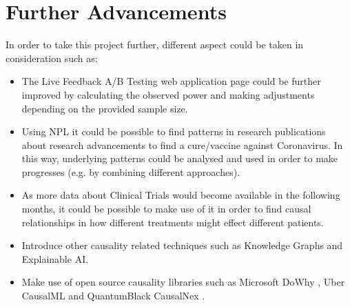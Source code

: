 \section{Further Advancements}

In order to take this project further, different aspect could be taken in consideration such as:
\vspace{-0.2cm}
\begin{itemize}
    \item The Live Feedback A/B Testing web application page could be further improved by calculating the observed power and making adjustments depending on the provided sample size.
    \item Using NPL it could be possible to find patterns in research publications about research advancements to find a cure/vaccine against Coronavirus. In this way, underlying patterns could be analysed and used in order to make progresses (e.g. by combining different approaches).
    \item As more data about Clinical Trials would become available in the following months, it could be possible to make use of it in order to find causal relationships in how different treatments might effect different patients. 
    \item Introduce other causality related techniques such as Knowledge Graphs and Explainable AI. 
    \item Make use of open source causality libraries such as Microsoft DoWhy \cite{dowhy}, Uber CausalML \cite{causalml} and QuantumBlack CausalNex \cite{causalnex}. 
\end{itemize}
\vspace{-0.2cm}

